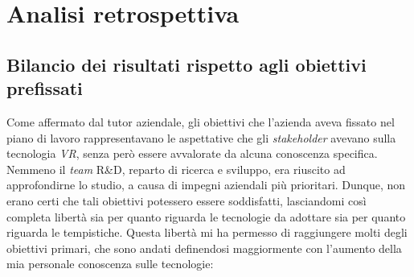 \newpage
\chapter{Analisi retrospettiva}
\label{cap:analisiretrospettiva}

\section{Bilancio dei risultati rispetto agli obiettivi prefissati}

Come affermato dal tutor aziendale, gli obiettivi che l'azienda aveva fissato nel piano di lavoro rappresentavano le aspettative che gli \textit{stakeholder}\hyperlink{sh}{} avevano sulla tecnologia \textit{VR}, senza però essere avvalorate da alcuna conoscenza specifica. Nemmeno il \textit{team} R\&D, reparto di ricerca e sviluppo, era riuscito ad approfondirne lo studio, a causa di impegni aziendali più prioritari. Dunque, non erano certi che tali obiettivi potessero essere soddisfatti, lasciandomi così completa libertà sia per quanto riguarda le tecnologie da adottare sia per quanto riguarda le tempistiche. Questa libertà mi ha permesso di raggiungere molti degli obiettivi primari, che sono andati definendosi maggiormente con l'aumento della mia personale conoscenza sulle tecnologie:
